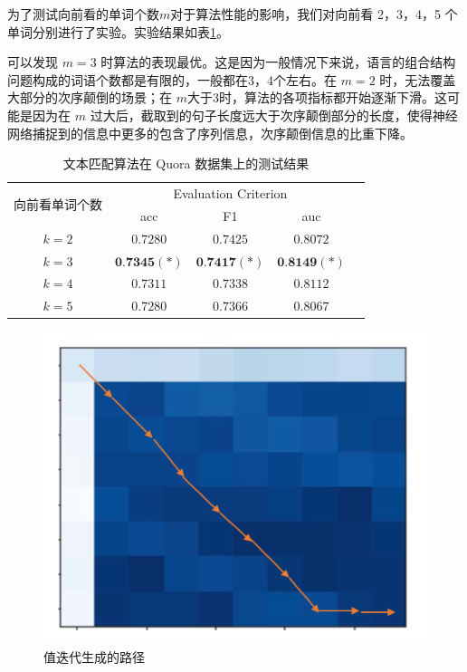 为了测试向前看的单词个数$m$对于算法性能的影响，我们对向前看 2，3，4，5 个单词分别进行了实验。实验结果如表\ref{tab:MDP_test}。

可以发现 $m=3$ 时算法的表现最优。这是因为一般情况下来说，语言的组合结构问题构成的词语个数都是有限的，一般都在3，4个左右。在 $m=2$ 时，无法覆盖大部分的次序颠倒的场景；在 $m$大于3时，算法的各项指标都开始逐渐下滑。这可能是因为在 $m$ 过大后，截取到的句子长度远大于次序颠倒部分的长度，使得神经网络捕捉到的信息中更多的包含了序列信息，次序颠倒信息的比重下降。

\begin{table}[htbp]
\caption{文本匹配算法在 Quora 数据集上的测试结果}\label{tab:MDP_test}
\vspace{0.5em}\centering\wuhao
\begin{tabular}{ccccc}
\toprule[1.5pt]
	\multirow{2}{*}{向前看单词个数} &
        \multicolumn{3}{c}{\multirow{1}{*}{Evaluation Criterion}} \\
        \cline{2-4} & acc & F1 & auc \\
        \hline
        $k=2$ & $0.7280$ & $0.7425$ & $0.8072$ \\
        $k=3$ & $\textbf{0.7345}(*)$ & $\textbf{0.7417}(*)$ & $\textbf{0.8149}(*)$ \\
        $k=4$ & $0.7311$ & $0.7338$ & $0.8112$\\
        $k=5$ & $0.7280$ & $0.7366$ & $0.8067$\\
        \bottomrule[1.5pt]
\end{tabular}
\vspace{\baselineskip}
\end{table}

\begin{figure}[!htbp]
\vspace{1em}
\centering
  \includegraphics[width=0.5\linewidth]{figures/val_iter_path}
  \caption{值迭代生成的路径}
  \label{fig:val_iter_path}       %
\vspace{1em}
\end{figure}

